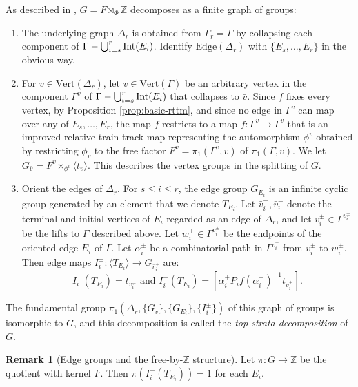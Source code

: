 \documentclass[11pt,oneside]{amsart}
\theoremstyle{definition}
\newtheorem{rem}[thm]{Remark}
\newcommand{\field}[1]{\mathbb{#1}}
\newcommand{\integers}{\ensuremath{\field{Z}}}
\newcommand{\interior} [1] {{\ensuremath \text{\rm Int}(#1) }}
\newcommand{\vertices}{\mathrm{Vert}}
\newcommand{\edges}{\mathrm{Edge}}
\begin{document}
As described in \cite{Macura:detour,Hagen:thickness,AndrewHughesKudlinska},  $G=F\rtimes_\Phi\integers$ decomposes as a finite 
graph of groups:
\begin{enumerate}
 \item The underlying graph $\Delta_r$ is obtained from $\Gamma_r=\Gamma$ by 
collapsing each component of 
$\Gamma-\bigcup_{i=s}^r\interior{E_i}$.  Identify $\edges(\Delta_r)$ with 
$\{E_s,\ldots,E_r\}$ in the obvious way.

\item For $\bar v\in\vertices(\Delta_r)$, let $v\in\vertices(\Gamma)$ be an 
arbitrary vertex in the component $\Gamma^v$ of 
$\Gamma-\bigcup_{i=s}^r\interior{E_i}$ that collapses to $\bar v$.  Since $f$ 
fixes every vertex, by Proposition \ref{prop:basic-rttm}, and since no edge in 
$\Gamma^v$ can map over any of $E_s,\ldots,E_r$, the map $f$ restricts to a map 
$f:\Gamma^v\to\Gamma^v$ that is an improved relative train track map 
representing the automorphism $\phi^v$ obtained by restricting $\phi_v$ to the 
free factor  $F^v=\pi_1(\Gamma^v,v)$ of $\pi_1(\Gamma,v)$.  We let 
$G_{\bar v}=F^v\rtimes_{\phi^v}\langle t_v\rangle$.  This describes the vertex 
groups in the splitting of $G$.

\item Orient the edges of $\Delta_r$.  For $s\leq i\leq r$, the edge group 
$G_{E_i}$ is an infinite cyclic group generated by an element that we denote 
$T_{E_i}$.  Let $\bar v_i^+,\bar v_i^-$ denote the terminal and initial vertices 
of $E_i$ regarded as an edge of $\Delta_r$, and let $v_i^\pm\in\Gamma^{v_i^\pm}$ 
be the lifts to $\Gamma$ described above.  Let $w_i^\pm\in \Gamma^{v_i^\pm}$ be 
the endpoints of the oriented edge $E_i$ of $\Gamma$.  Let $\alpha_i^\pm$ be a combinatorial path in 
$\Gamma^{v_i^\pm}$ from $v_i^\pm$ to $w_i^\pm$.  Then edge maps 
$I_i^\pm:\langle T_{E_i}\rangle\to G_{\bar v^\pm_i}$ are:
$$I_i^-(T_{E_i})=t_{v_i^-}\text{ \ and \  }I_i^+(T_{E_i})=[\alpha^+_iP_if(\alpha_i^+)^{-1} t_{v_i^+}].$$
\end{enumerate}

The fundamental group $\pi_1(\Delta_r,\{G_v\},\{G_{E_i}\},\{I_i^\pm\})$ of this 
graph of groups is isomorphic to $G$, and this decomposition is called the 
\emph{top strata decomposition} of $G$.

\begin{rem}[Edge groups and the 
free-by-$\integers$ structure]\label{rem:edge-groups-relate-to-fibres}
Let $\pi:G\to\integers$ be the quotient with kernel $F$.  Then $\pi(I_i^\pm(T_{E_i}))=1$ for each $E_i$.  
\end{rem}
\end{document}

